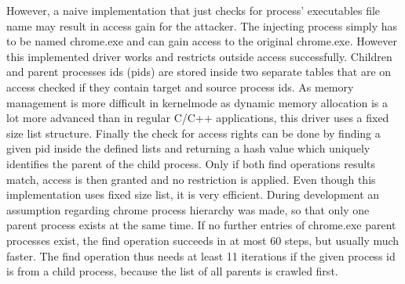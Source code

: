 However, a naive implementation that just checks for process' executables file name may result in access gain for the attacker. The  injecting process simply has to be named chrome.exe and can gain access to the original chrome.exe. However this implemented driver works and restricts outside access successfully. Children and parent processes ids (pids) are stored inside two separate tables that are on access checked if they contain target and source process ids. As memory management is more difficult in kernelmode as dynamic memory allocation is a lot more advanced than in regular C/C++ applications, this driver uses a fixed size list structure. Finally the check for access rights can be done by finding a given pid inside the defined lists and returning a hash value which uniquely identifies the parent of the child process. Only if both find operations results match, access is then granted and no restriction is applied. Even though this implementation uses fixed size list, it is very efficient. During development an assumption regarding chrome process hierarchy was made, so that only one parent process exists at the same time. If no further entries of chrome.exe parent processes exist, the find operation succeeds in at most 60 steps, but usually much faster. The find operation thus needs at least 11 iterations if the given process id is from a child process, because the list of all parents is crawled first.